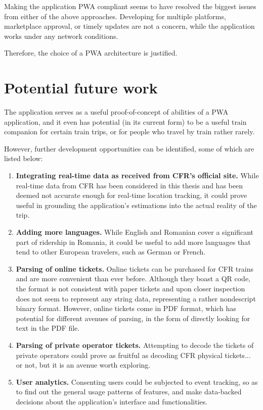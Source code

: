 Making the application PWA compliant seems to have resolved the biggest issues from either of the above approaches. Developing for multiple platforms, marketplace approval, or timely updates are not a concern, while the application works under any network conditions.

Therefore, the choice of a PWA architecture is justified.

\section{Potential future work}
The application serves as a useful proof-of-concept of abilities of a PWA application, and it even has potential (in its current form) to be a useful train companion for certain train trips, or for people who travel by train rather rarely.

However, further development opportunities can be identified, some of which are listed below:

\begin{enumerate}
    \item \textbf{Integrating real-time data as received from CFR's official site.} While real-time data from CFR has been considered in this thesis and has been deemed not accurate enough for real-time location tracking, it could prove useful in grounding the application's estimations into the actual reality of the trip.
    \item \textbf{Adding more languages.} While English and Romanian cover a significant part of ridership in Romania, it could be useful to add more languages that tend to other European travelers, such as German or French.
    \item \textbf{Parsing of online tickets.} Online tickets can be purchased for CFR trains and are more convenient than ever before. Although they boast a QR code, the format is not consistent with paper tickets and upon closer inspection does not seem to represent any string data, representing a rather nondescript binary format. However, online tickets come in PDF format, which has potential for different avenues of parsing, in the form of directly looking for text in the PDF file.
    \item \textbf{Parsing of private operator tickets.} Attempting to decode the tickets of private operators could prove as fruitful as decoding CFR physical tickets... or not, but it is an avenue worth exploring.
    \item \textbf{User analytics.} Consenting users could be subjected to event tracking, so as to find out the general usage patterns of features, and make data-backed decisions about the application's interface and functionalities.
\end{enumerate}